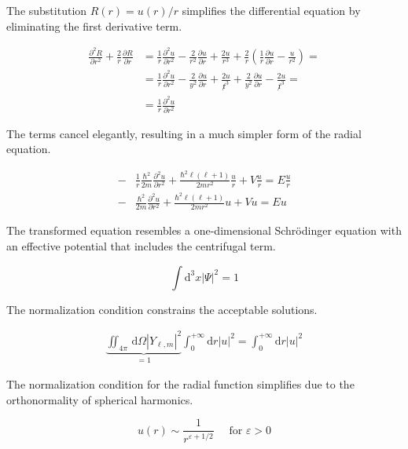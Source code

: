 \documentclass[italian]{HKNdocument}
\begin{document}
The substitution $R(r) = u(r)/r$ simplifies the differential equation by eliminating the first derivative term.

\begin{align}
\frac{\partial^{2} R}{\partial r^{2}}+\frac{2}{r} \frac{\partial R}{\partial r} & =\frac{1}{r} \frac{\partial^{2} u}{\partial r^{2}}-\frac{2}{r^{2}} \frac{\partial u}{\partial r}+\frac{2 u}{r^{3}}+\frac{2}{r}\left(\frac{1}{r} \frac{\partial u}{\partial r}-\frac{u}{r^{2}}\right)= \\
& =\frac{1}{r} \frac{\partial^{2} u}{\partial r^{2}}-\frac{2}{y^{2}} \frac{\partial u}{\partial r}+\frac{2 u}{\not r^{3}}+\frac{2}{y^{2}} \frac{\partial u}{\partial r}-\frac{2 u}{\not r^{3}}=  \label{eq:9.35}\\
& =\frac{1}{r} \frac{\partial^{2} u}{\partial r^{2}}
\end{align}

The terms cancel elegantly, resulting in a much simpler form of the radial equation.

\begin{align}
- & \frac{1}{r} \frac{\hbar^{2}}{2 m} \frac{\partial^{2} u}{\partial r^{2}}+\frac{\hbar^{2} \ell(\ell+1)}{2 m r^{2}} \frac{u}{r}+V \frac{u}{r}=E \frac{u}{r}  \label{eq:9.36}\\
- & \frac{\hbar^{2}}{2 m} \frac{\partial^{2} u}{\partial r^{2}}+\frac{\hbar^{2} \ell(\ell+1)}{2 m r^{2}} u+V u=E u
\end{align}

The transformed equation resembles a one-dimensional Schrödinger equation with an effective potential that includes the centrifugal term.

\begin{equation}
\int \mathrm{d}^{3} x|\Psi|^{2}=1 \label{eq:9.37}
\end{equation}

The normalization condition constrains the acceptable solutions.

\begin{align}
\underbrace{\iint_{4 \pi} \, \mathrm{d} \Omega\left|Y_{\ell, m}\right|^{2}}_{=1} \int_{0}^{+\infty} \mathrm{d} r |u|^{2} = \int_{0}^{+\infty} \mathrm{d} r|u|^{2} \label{eq:9.38}
\end{align}

The normalization condition for the radial function simplifies due to the orthonormality of spherical harmonics.

\begin{equation}
u(r) \sim \frac{1}{r^{\varepsilon+1 / 2}} \quad \text { for } \varepsilon>0 \label{eq:9.39}
\end{equation}
\end{document}
